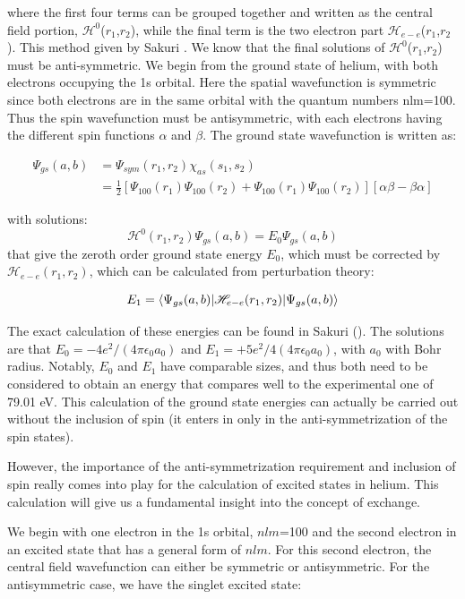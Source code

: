where the first four terms can be grouped together and written as the central field portion, $\mathscr{H}^0$($r_1$,$r_2$), while the final term is the two electron part $\mathscr{H}_{e-e}$($r_1$,$r_2$). This method given by Sakuri \cite{Sakuri1994}. We know that the final solutions of $\mathscr{H}^0$($r_1$,$r_2$) must be anti-symmetric. We begin from the ground state of helium, with both electrons occupying the 1s orbital. Here the spatial wavefunction is symmetric since both electrons are in the same orbital with the quantum numbers nlm=100. Thus the spin wavefunction must be antisymmetric, with each electrons having the different spin functions $\alpha$ and $\beta$. The ground state wavefunction is written as:

\begin{align}
\Psi_{gs}(a,b) &= \Psi_{sym}(r_1,r_2)\chi_{as}(s_1,s_2) \\
	&=\frac{1}{2}[\Psi_{100}(r_1)\Psi_{100}(r_2)+\Psi_{100}(r_1)\Psi_{100}(r_2)][\alpha\beta-\beta\alpha]
\end{align}	

with solutions:
\begin{equation}
\mathscr{H}^0(r_1,r_2)\Psi_{gs}(a,b)=E_0\Psi_{gs}(a,b)
\end{equation}
that give the zeroth order ground state energy $E_0$, which must be corrected by $\mathscr{H}_{e-e}(r_1,r_2)$, which can be calculated from perturbation theory:

\begin{equation}
E_1=\braket{\Psi_{gs}(a,b)|\mathscr{H}_{e-e}(r_1,r_2)|\Psi_{gs}(a,b)}
\end{equation}

The exact calculation of these energies can be found in Sakuri (\cite{Sakuri1994}). The solutions are that $E_0=-4e^2/(4\pi\epsilon_0 a_0)$ and $E_1=+5e^2/4(4\pi\epsilon_0a_0)$, with $a_0$ with Bohr radius. Notably, $E_0$ and $E_1$ have comparable sizes, and thus both need to be considered to obtain an energy that compares well to the experimental one of 79.01 eV. This calculation of the ground state energies can actually be carried out without the inclusion of spin (it enters in only in the anti-symmetrization of the spin states).

However, the importance of the anti-symmetrization requirement and inclusion of spin really comes into play for the calculation of excited states in helium. This calculation will give us a fundamental insight into the concept of exchange. 

We begin with one electron in the 1s orbital, $nlm$=100 and the second electron in an excited state that has a general form of $nlm$. For this second electron, the central field wavefunction can either be symmetric or antisymmetric. For the antisymmetric case, we have the singlet excited state:

